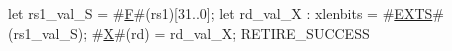 let rs1_val_S            = #\hyperref[sailRISCVzF]{F}#(rs1)[31..0];
let rd_val_X  : xlenbits = #\hyperref[sailRISCVzEXTS]{EXTS}#(rs1_val_S);
#\hyperref[sailRISCVzX]{X}#(rd) = rd_val_X;
RETIRE_SUCCESS
